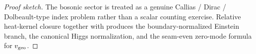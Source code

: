 \begin{proof}[Proof sketch]
The bosonic sector is treated as a genuine Callias / Dirac / Dolbeault-type index problem rather
than a scalar counting exercise. Relative heat-kernel closure together with
produces the boundary-normalized Einstein branch, the canonical Higgs normalization, and the
seam-even zero-mode formula for $v_{\mathrm{geo}}$.
\end{proof}

